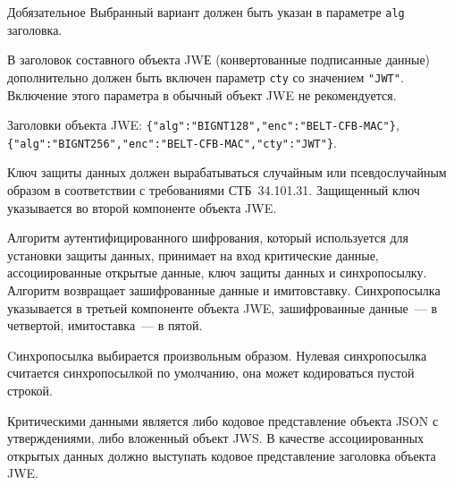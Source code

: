 \begin{appendix}{Д}{обязательное}{}
Выбранный вариант должен быть указан в параметре \lstinline{alg} заголовка. 

В заголовок составного объекта JWЕ (конвертованные подписанные данные) 
дополнительно должен быть включен параметр \lstinline{cty} со значением 
\lstinline{"JWT"}. 
%
Включение этого параметра в обычный объект JWE не рекомендуется.

\begin{example*}
Заголовки объекта JWE: 
\lstinline|{"alg":"BIGNT128","enc":"BELT-CFB-MAC"}|,
\lstinline|{"alg":"BIGNT256","enc":"BELT-CFB-MAC","cty":"JWT"}|.
\end{example*}

Ключ защиты данных должен вырабатываться случайным или псевдослучайным образом 
в соответствии с требованиями СТБ~34.101.31.
%
Защищенный ключ указывается во второй компоненте объекта JWE.

Алгоритм аутентифицированного шифрования, который используется для установки 
защиты данных, принимает на вход критические данные, ассоциированные открытые 
данные, ключ защиты данных и синхропосылку. Алгоритм возвращает зашифрованные 
данные и имитовставку.
%
Синхропосылка указывается в третьей компоненте объекта JWE, зашифрованные 
данные~--- в четвертой, имитоставка~--- в пятой.

Cинхропосылка выбирается произвольным образом.
%
Нулевая синхропосылка считается синхропосылкой по умолчанию, она может 
кодироваться пустой строкой.

Критическими данными является либо кодовое представление объекта JSON с 
утверждениями, либо вложенный объект JWS. 
%
В качестве ассоциированных открытых данных должно выступать кодовое 
представление заголовка объекта JWE.

\end{appendix}
